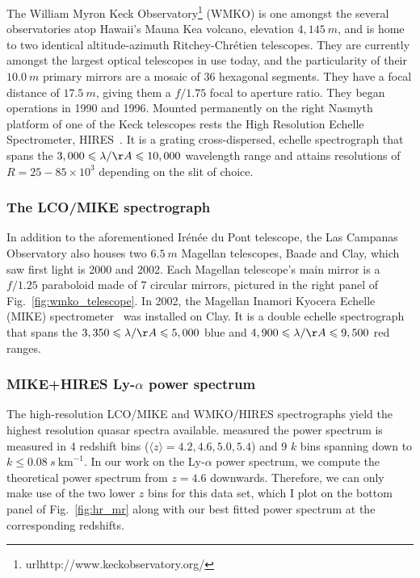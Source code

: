The William Myron Keck Observatory\footnote{url{http://www.keckobservatory.org/}} (WMKO) is one amongst the several observatories atop Hawaii's Mauna Kea volcano, elevation $4,145~m$, and is home to two identical altitude-azimuth Ritchey-Chr\'etien telescopes. They are currently amongst the largest optical telescopes in use today, and the particularity of their $10.0~m$ primary mirrors are a mosaic of $36$ hexagonal segments. They have a focal distance of $17.5~m$, giving them a $f/1.75$ focal to aperture ratio. They began operations in 1990 and 1996. Mounted permanently on the right Nasmyth platform of one of the Keck telescopes rests the High Resolution Echelle Spectrometer, HIRES~\citep{HIRES}. It is a grating cross-dispersed, echelle spectrograph that spans the $3,000 \leqslant \lambda / {\AA} \leqslant 10,000$ wavelength range and attains resolutions of $R=25-85 \times 10^3$ depending on the slit of choice.



\subsubsection{The LCO/MIKE spectrograph}

In addition to the aforementioned Ir\'en\'ee du Pont telescope, the Las Campanas Observatory also houses two $6.5~m$ Magellan telescopes, Baade and Clay, which saw first light is 2000 and 2002. Each Magellan telescope's main mirror is a $f/1.25$ paraboloid made of 7 circular mirrors, pictured in the right panel of Fig.~\ref{fig:wmko_telescope}. In 2002, the Magellan Inamori Kyocera Echelle (MIKE) spectrometer~\citep{MIKE} was installed on Clay. It is a double echelle spectrograph that spans the $3,350 \leqslant \lambda / {\AA} \leqslant 5,000$ blue and $4,900 \leqslant \lambda / {\AA} \leqslant 9,500$ red ranges.

\subsubsection{MIKE+HIRES Ly-$\alpha$ power spectrum}

The high-resolution LCO/MIKE and WMKO/HIRES spectrographs yield the highest resolution quasar spectra available. \cite{HRdata} measured the power spectrum is measured in 4 redshift bins ($\langle z \rangle = 4.2, 4.6, 5.0, 5.4$) and 9 $k$ bins spanning down to $k \leq 0.08~ s~\mathrm{km}^{-1}$. In our work on the Ly-$\alpha$ power spectrum, we compute the theoretical  power spectrum from $z=4.6$ downwards. Therefore, we can only make use of the two lower $z$ bins for this data set, which I plot on the bottom panel of Fig.~\ref{fig:hr_mr} along with our best fitted power spectrum at the corresponding redshifts. 
